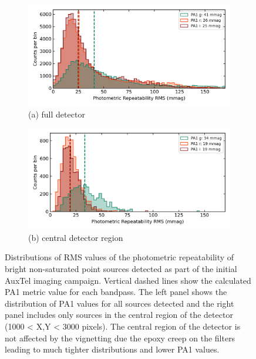 \begin{figure}[ht]
\begin{subfigure}{.5\textwidth}
    \centering
    \includegraphics[width=1.0\textwidth]{figures/pa1_auxtel}
     \caption{(a) full detector}
\end{subfigure}
\begin{subfigure}{.5\textwidth} 
    \centering
    \includegraphics[width=1.0\textwidth]{figures/pa1_auxtel_central}
    \caption{(b) central detector region}
\end{subfigure}
\par\medskip 
\caption[short]{\label{fig:faro_auxtel_metrics} 
Distributions of RMS values of the photometric repeatability of  bright non-saturated  point sources detected as part of the initial AuxTel imaging campaign. Vertical dashed lines show the calculated PA1 metric value for each bandpass. The left panel shows the distribution of PA1 values for all sources detected and the right panel includes only sources in the central region of the detector (1000 < X,Y < 3000 pixels). The central region of the detector is not affected by the vignetting due the epoxy creep on the filters leading to much tighter distributions and lower PA1 values.}
\end{figure}

